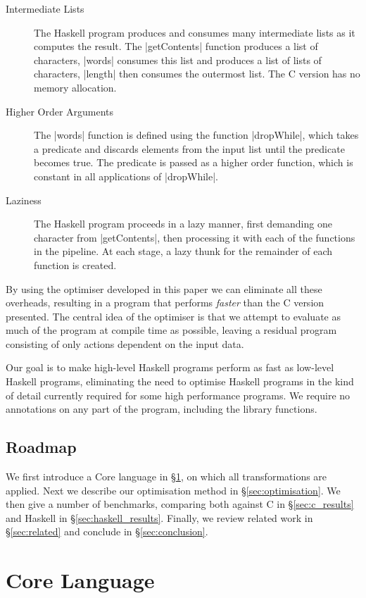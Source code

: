 \documentclass{llncs}
\begin{document}
\begin{description}
\item[Intermediate Lists] The Haskell program produces and consumes many intermediate lists as it computes the result. The |getContents| function produces a list of characters, |words| consumes this list and produces a list of lists of characters, |length| then consumes the outermost list. The C version has no memory allocation.
\item[Higher Order Arguments] The |words| function is defined using the function |dropWhile|, which takes a predicate and discards elements from the input list until the predicate becomes true. The predicate is passed as a higher order function, which is constant in all applications of |dropWhile|.
\item[Laziness] The Haskell program proceeds in a lazy manner, first demanding one character from |getContents|, then processing it with each of the functions in the pipeline. At each stage, a lazy thunk for the remainder of each function is created.
\end{description}

By using the optimiser developed in this paper we can eliminate all these overheads, resulting in a program that performs \textit{faster} than the C version presented. The central idea of the optimiser is that we attempt to evaluate as much of the program at compile time as possible, leaving a residual program consisting of only actions dependent on the input data.

Our goal is to make high-level Haskell programs perform as fast as low-level Haskell programs, eliminating the need to optimise Haskell programs in the kind of detail currently required for some high performance programs. We require no annotations on any part of the program, including the library functions.

\subsection{Roadmap}

We first introduce a Core language in \S\ref{sec:core}, on which all transformations are applied. Next we describe our optimisation method in \S\ref{sec:optimisation}. We then give a number of benchmarks, comparing both against C in \S\ref{sec:c_results} and Haskell in \S\ref{sec:haskell_results}. Finally, we review related work in \S\ref{sec:related} and conclude in \S\ref{sec:conclusion}.

\section{Core Language}
\label{sec:core}
\end{document}

